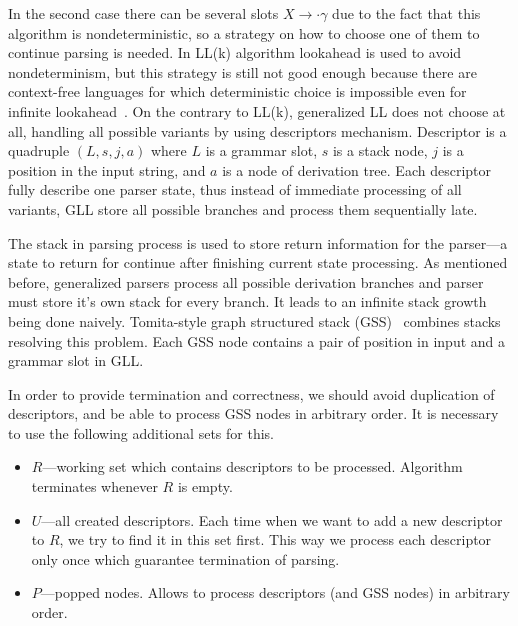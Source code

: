 In the second case there can be several slots $X \rightarrow \cdot \gamma$ due to the fact that this algorithm is nondeterministic, so a strategy on how to choose one of them to continue parsing is needed.
In LL(k) algorithm lookahead is used to avoid nondeterminism, but this strategy is still not good enough because there are context-free languages for which deterministic choice is impossible even for infinite lookahead~\cite{LLnonLL}.
On the contrary to LL(k), generalized LL does not choose at all, handling all possible variants by using descriptors mechanism.
Descriptor is a quadruple $(L, s, j, a)$ where $L$ is a grammar slot, $s$ is a stack node, $j$ is a position in the input string, and $a$ is a node of derivation tree.
Each descriptor fully describe one parser state, thus instead of immediate processing of all variants, GLL store all possible branches and process them sequentially late.

The stack in parsing process is used to store return information for the parser---a state to return for continue after finishing current state processing.
As mentioned before, generalized parsers process all possible derivation branches and parser must store it's own stack for every branch. 
It leads to an infinite stack growth being done naively.  
Tomita-style graph structured stack (GSS)~\cite{Tomita} combines stacks resolving this problem.
Each GSS node contains a pair of position in input and a grammar slot in GLL. 

In order to provide termination and correctness, we should avoid duplication of descriptors, and be able to process GSS nodes in arbitrary order. It is necessary to use the following additional sets for this.
\begin{itemize}
\item $R$---working set which contains descriptors to be processed. Algorithm terminates whenever $R$ is empty.
\item $U$---all created descriptors. Each time when we want to add a new descriptor to $R$, we try to find it in this set first.
This way we process each descriptor only once which guarantee termination of parsing.
\item $P$---popped nodes. Allows to process descriptors (and GSS nodes) in arbitrary order. 
\end{itemize}


